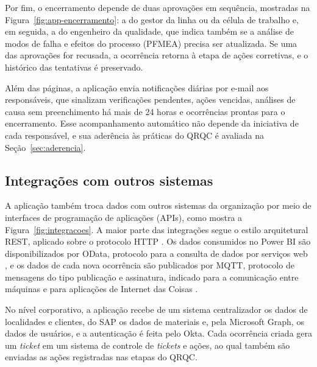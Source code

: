
Por fim, o encerramento depende de duas aprovações em sequência, mostradas na Figura~\ref{fig:app-encerramento}: a do gestor da linha ou da célula de trabalho e, em seguida, a do engenheiro da qualidade, que indica também se a análise de modos de falha e efeitos do processo (PFMEA) precisa ser atualizada. Se uma das aprovações for recusada, a ocorrência retorna à etapa de ações corretivas, e o histórico das tentativas é preservado.


Além das páginas, a aplicação envia notificações diárias por e-mail aos responsáveis, que sinalizam verificações pendentes, ações vencidas, análises de causa sem preenchimento há mais de 24 horas e ocorrências prontas para o encerramento. Esse acompanhamento automático não depende da iniciativa de cada responsável, e sua aderência às práticas do QRQC é avaliada na Seção~\ref{sec:aderencia}.

\subsection{Integrações com outros sistemas}
\label{subsec:integracoes}

A aplicação também troca dados com outros sistemas da organização por meio de interfaces de programação de aplicações (APIs), como mostra a Figura~\ref{fig:integracoes}. A maior parte das integrações segue o estilo arquitetural REST, aplicado sobre o protocolo HTTP \cite[cap.~5--6]{fielding2000}. Os dados consumidos no Power BI são disponibilizados por OData, protocolo para a consulta de dados por serviços web \cite{oasis2020odata}, e os dados de cada nova ocorrência são publicados por MQTT, protocolo de mensagens do tipo publicação e assinatura, indicado para a comunicação entre máquinas e para aplicações de Internet das Coisas \cite{oasis2019mqtt}.

No nível corporativo, a aplicação recebe de um sistema centralizador os dados de localidades e clientes, do SAP os dados de materiais e, pela Microsoft Graph, os dados de usuários, e a autenticação é feita pelo Okta. Cada ocorrência criada gera um \textit{ticket} em um sistema de controle de \textit{tickets} e ações, ao qual também são enviadas as ações registradas nas etapas do QRQC.

